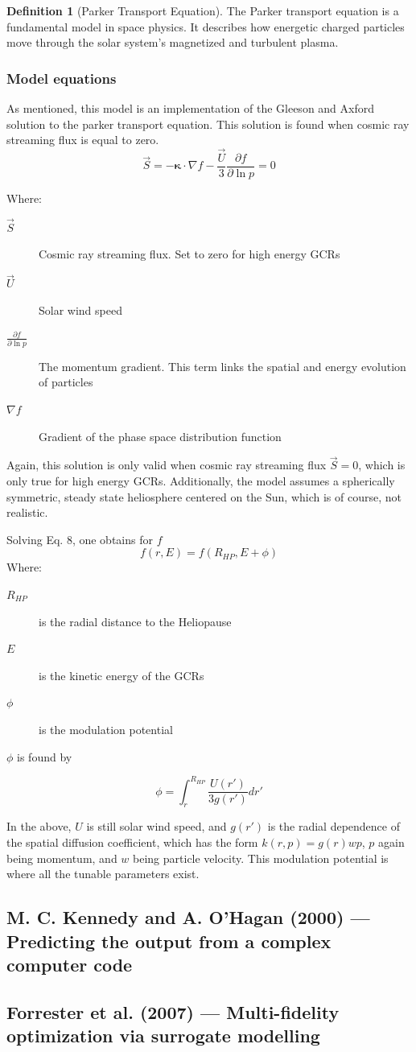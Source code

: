 \documentclass[11pt]{article}
\newcommand{\paper}[1]{\clearpage\subsection{#1}}
\newcommand{\subsubentry}[1]{\subsubsection{#1}}
\theoremstyle{definition}
\newtheorem{definition}{Definition}
\begin{document}
\begin{definition}[Parker Transport Equation]
The Parker transport equation is a fundamental model in space physics. It describes how
energetic charged particles move through the solar system's magnetized and turbulent
plasma. 
\end{definition}
\subsubentry{Model equations}
As mentioned, this model is an implementation of the Gleeson and Axford solution to the parker transport equation.
This solution is found when cosmic ray streaming flux is equal to zero.
\begin{equation}
  \vec{S} = -\mathbf{\kappa} \cdot \nabla{f} - \frac{\vec{U}}{3}\frac{\partial f}{\partial \ln{p}} = 0
  \label{eq:parker-transport}
\end{equation}

Where:
\begin{description}
  \item[$\vec{S}$] Cosmic ray streaming flux. Set to zero for high energy GCRs
  \item[$\vec{U}$] Solar wind speed
  \item[$\frac{\partial f}{\partial \ln{p}}$] The momentum gradient. This term links the spatial and energy evolution of particles
  \item[$\nabla{f}$] Gradient of the phase space distribution function
\end{description}

Again, this solution is only valid when cosmic ray streaming flux $\vec{S} = 0$, which is only true
for high energy GCRs. Additionally, the model assumes a spherically symmetric, steady state heliosphere
centered on the Sun, which is of course, not realistic.

Solving Eq. 8, one obtains for $f$
\begin{equation}
  f(r, E) = f(R_{HP}, E + \phi)
  \label{eq:phase-space-distribution-function}
\end{equation}
Where:
\begin{description}
  \item[$R_{HP}$] is the radial distance to the Heliopause
  \item[$E$] is the kinetic energy of the GCRs
  \item[$\phi$] is the modulation potential
\end{description}

$\phi$ is found by

\begin{equation}
  \phi = \int_{r}^{R_{HP}}\frac{U(r')}{3g(r')}dr'
  \label{eq:phi}
\end{equation}

In the above, $U$ is still solar wind speed, and $g(r')$ is the radial dependence of the spatial diffusion
coefficient, which has the form $k(r,p) = g(r)wp$, $p$ again being momentum, and $w$ being particle velocity.
This modulation potential is where all the tunable parameters exist.

\paper{M. C. Kennedy and A. O'Hagan (2000) --- Predicting the output from a complex computer code}

\paper{Forrester et al. (2007) --- Multi-fidelity optimization via surrogate modelling}
\end{document}
